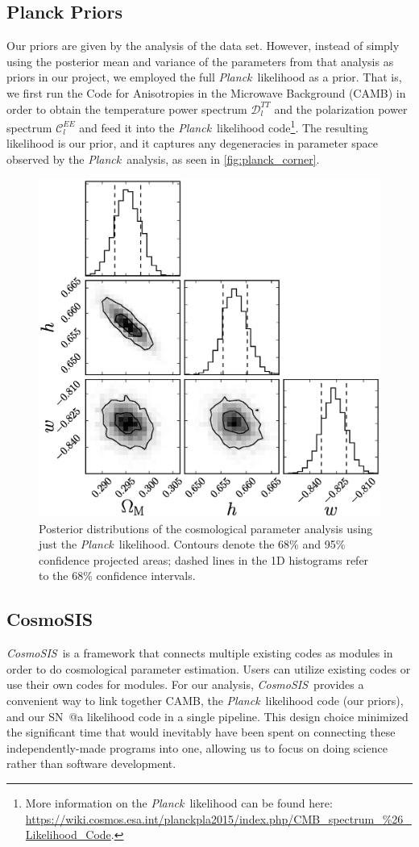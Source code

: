 \documentclass[12pt,a4paper]{article}
\makeatletter
\newcommand\Planck{{\it Planck}\ }
\newcommand\CosmoSIS{{\it CosmoSIS}\ }
\newcommand*{\rom}[1]{\expandafter\@slowromancap\romannumeral #1@}
\newcommand{\sna}{\mbox{SN \rom{1}a}}
\makeatother
\begin{document}
\subsection{Planck Priors}
\label{sec:planck_priors}
Our priors are given by the analysis of the \citet{planck2013} data set.
However, instead of simply using the posterior mean and variance of
the parameters from that analysis as priors in our project, we
employed the full \Planck likelihood as a prior. That is,
we first run the Code for Anisotropies in the Microwave Background (CAMB)
in order to obtain the temperature power spectrum $\mathcal{D}_l^{TT}$
and the polarization power spectrum $\mathcal{C}_l^{EE}$
and feed it into the \Planck likelihood code\footnote{More information
on the \Planck likelihood can be found here: 
\url{https://wiki.cosmos.esa.int/planckpla2015/index.php/CMB_spectrum_\%26_Likelihood_Code}.}.
The resulting likelihood
is our prior, and it captures any degeneracies in parameter space
observed by the \Planck analysis, as seen in \autoref{fig:planck_corner}. 
%
\begin{figure}
  \centering
  \includegraphics[width=0.5\linewidth]{figures/nosn_wcdm_corner.eps}
  \caption{Posterior distributions of the cosmological parameter
    analysis using just the \Planck likelihood. Contours denote the
    68\% and 95\% confidence projected areas; dashed lines in
    the 1D histograms refer to the 68\% confidence intervals.}
  \label{fig:planck_corner}
\end{figure}
%

\subsection{CosmoSIS}
\label{sec:CosmoSIS}
\CosmoSIS is a framework that connects multiple existing codes as 
modules in order to do cosmological parameter estimation. Users 
can utilize existing codes or use their own codes for modules. For 
our analysis, \CosmoSIS provides a convenient way to link together 
CAMB, the \Planck likelihood code (our priors), and our {\sna} likelihood 
code in a single pipeline. This design choice minimized the significant
time that would inevitably have been spent on connecting these 
independently-made programs into one, allowing us to focus on 
doing science rather than software development.
\end{document}

